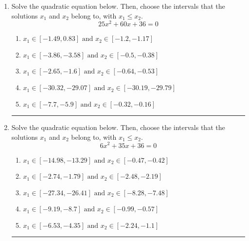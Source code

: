 \documentclass[14pt]{extbook}
\newcommand{\litem}[1]{\item#1\hspace*{-1cm}\rule{\textwidth}{0.4pt}}
\begin{document}
\begin{enumerate}
\litem{
Solve the quadratic equation below. Then, choose the intervals that the solutions $x_1$ and $x_2$ belong to, with $x_1 \leq x_2$.\[ 25x^{2} +60 x + 36 = 0 \]\begin{enumerate}[label=\Alph*.]
\item \( x_1 \in [-1.49, 0.83] \text{ and } x_2 \in [-1.2, -1.17] \)
\item \( x_1 \in [-3.86, -3.58] \text{ and } x_2 \in [-0.5, -0.38] \)
\item \( x_1 \in [-2.65, -1.6] \text{ and } x_2 \in [-0.64, -0.53] \)
\item \( x_1 \in [-30.32, -29.07] \text{ and } x_2 \in [-30.19, -29.79] \)
\item \( x_1 \in [-7.7, -5.9] \text{ and } x_2 \in [-0.32, -0.16] \)

\end{enumerate} }
\litem{
Solve the quadratic equation below. Then, choose the intervals that the solutions $x_1$ and $x_2$ belong to, with $x_1 \leq x_2$.\[ 6x^{2} +35 x + 36 = 0 \]\begin{enumerate}[label=\Alph*.]
\item \( x_1 \in [-14.98, -13.29] \text{ and } x_2 \in [-0.47, -0.42] \)
\item \( x_1 \in [-2.74, -1.79] \text{ and } x_2 \in [-2.48, -2.19] \)
\item \( x_1 \in [-27.34, -26.41] \text{ and } x_2 \in [-8.28, -7.48] \)
\item \( x_1 \in [-9.19, -8.7] \text{ and } x_2 \in [-0.99, -0.57] \)
\item \( x_1 \in [-6.53, -4.35] \text{ and } x_2 \in [-2.24, -1.1] \)


\end{enumerate}}
\end{enumerate}
\end{document}
